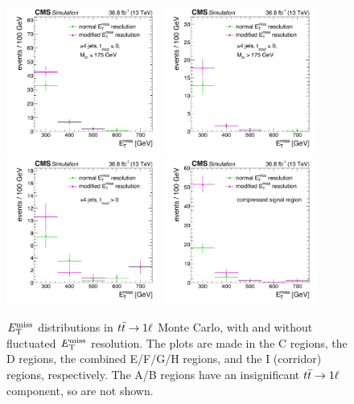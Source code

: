\begin{figure}
\centering
\includegraphics[width=0.45\textwidth]{figures/metres_1ltop_C.pdf}
\includegraphics[width=0.45\textwidth]{figures/metres_1ltop_D.pdf}
\includegraphics[width=0.45\textwidth]{figures/metres_1ltop_EFGH.pdf}
\includegraphics[width=0.45\textwidth]{figures/metres_1ltop_I.pdf}
\caption{$E_\text{T}^\text{miss}$ distributions in $t\bar{t} \rightarrow 1\ell$ Monte Carlo, with and
  without fluctuated $E_\text{T}^\text{miss}$ resolution. The plots are made
  in the C regions, the D regions, the combined E/F/G/H regions, and
  the I (corridor) regions, respectively. The A/B regions have an
  insignificant $t\bar{t} \rightarrow 1\ell$ component, so are not shown.}
\label{fig:stop:1ltop:metres}
\end{figure}

